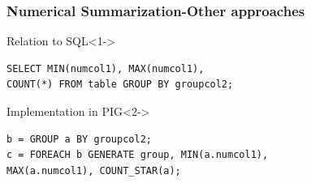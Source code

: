 \documentclass[xcolor=dvipsnames,dvip,notes=show,table]{beamer}
\begin{document}
\begin{frame}[fragile]
  \frametitle{Numerical Summarization-Other approaches}
  \begin{block}{Relation to SQL}<1->
  
  \begin{lstlisting}
SELECT MIN(numcol1), MAX(numcol1),
COUNT(*) FROM table GROUP BY groupcol2;
\end{lstlisting}
\end{block}

\begin{exampleblock}{Implementation in PIG}<2->

\begin{lstlisting}
b = GROUP a BY groupcol2;
c = FOREACH b GENERATE group, MIN(a.numcol1),
MAX(a.numcol1), COUNT_STAR(a);
\end{lstlisting}

\end{exampleblock}

\end{frame}


\end{document}
